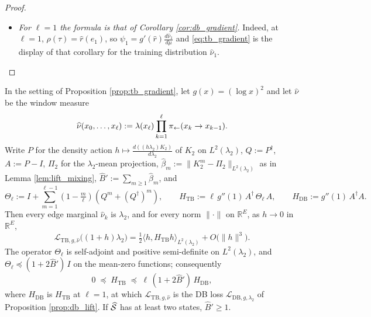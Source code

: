\begin{proof}
\begin{itemize}
\begin{eqnarray}
    &=& \sum_{k=1}^\ell \left\langle \left(\psi_k\lambda_2\right) K_2^{\lambda_2} - \widehat r\psi_k\lambda_2 \,\middle|\, \delta\right\rangle_{\lambda_2},\nonumber
\end{eqnarray}
the second equality by Lemma \ref{lem:lift_wellposed} and Lemma \ref{lem:adjoint}\emph{(3)}, applied to $K_2$ and its invariant measure $\lambda_2$; this is \eqref{eq:tb_gradient}.
    \item \emph{For $\ell=1$ the formula is that of Corollary \ref{cor:db_gradient}.} Indeed, at $\ell=1$, $\rho(\tau)=\widehat r(e_1)$, so $\psi_1=g'(\widehat r)\frac{d\widehat\nu_1}{d\mu}$ and \eqref{eq:tb_gradient} is the display of that corollary for the training distribution $\widehat\nu_1$.
\end{itemize}
\end{proof}

\begin{proposition}[TB Hessian]\label{prop:tb_hessian}
In the setting of Proposition \ref{prop:tb_gradient}, let $g(x) = (\log x)^2$ and let $\widehat\nu$ be the window measure
\begin{equation*}
    \widehat\nu(x_0,\dots,x_\ell):=\lambda(x_\ell)\prod_{k=1}^{\ell}\pi_{\leftarrow}(x_k\rightarrow x_{k-1}).
\end{equation*}
Write $P$ for the density action $h\mapsto\frac{d((h\lambda_2)K_2)}{d\lambda_2}$ of $K_2$ on $L^2(\lambda_2)$, $Q:=P^\dagger$, $A:=P-I$, $\Pi_2$ for the $\lambda_2$-mean projection, $\widehat\beta_m:=\|K_2^m-\Pi_2\|_{L^2(\lambda_2)}$ as in Lemma \ref{lem:lift_mixing}, $\widehat B' := \sum_{m\geq1}\widehat\beta_m$, and
\begin{equation*}
    \Theta_\ell := I + \sum_{m=1}^{\ell-1}\left(1-\tfrac m\ell\right)\left(Q^m + (Q^\dagger)^m\right),\qquad
    H_{\mathrm{TB}} := \ell\, g''(1)\, A^\dagger\, \Theta_\ell\, A,\qquad H_{\mathrm{DB}}:=g''(1)\,A^\dagger A .
\end{equation*}
Then every edge marginal $\widehat\nu_k$ is $\lambda_2$, and for every norm $\|\cdot\|$ on $\mathbb R^E$, as $h\rightarrow0$ in $\mathbb R^E$,
\begin{equation}
    \mathcal L_{\mathrm{TB},g,\widehat\nu}\bigl((1+h)\lambda_2\bigr) = \tfrac12\langle h, H_{\mathrm{TB}}h\rangle_{L^2(\lambda_2)} + O\bigl(\|h\|^3\bigr).
\end{equation}
The operator $\Theta_\ell$ is self-adjoint and positive semi-definite on $L^2(\lambda_2)$, and $\Theta_\ell\preceq(1+2\widehat B')\,I$ on the mean-zero functions; consequently
\begin{equation}
    0\;\preceq\; H_{\mathrm{TB}} \;\preceq\; \ell\,(1 + 2\widehat B')\, H_{\mathrm{DB}},
\end{equation}
where $H_{\mathrm{DB}}$ is $H_{\mathrm{TB}}$ at $\ell=1$, at which $\mathcal L_{\mathrm{TB},g,\widehat\nu}$ is the DB loss $\mathcal L_{\mathrm{DB},g,\lambda_2}$ of Proposition \ref{prop:db_lift}. If $\widehat{\mathcal S}$ has at least two states, $\widehat B'\geq1$.
\end{proposition}

